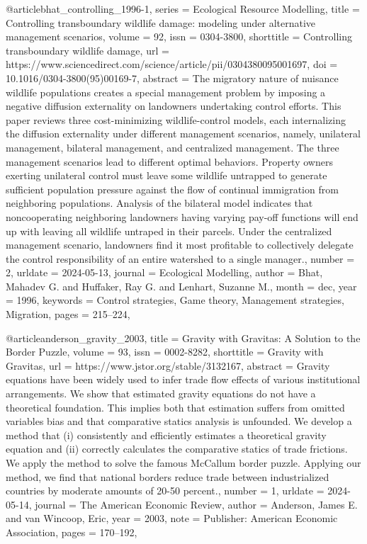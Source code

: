 {{{{@article{bhat_controlling_1996-1,
	series = {Ecological {Resource} {Modelling}},
	title = {Controlling transboundary wildlife damage: modeling under alternative management scenarios},
	volume = {92},
	issn = {0304-3800},
	shorttitle = {Controlling transboundary wildlife damage},
	url = {https://www.sciencedirect.com/science/article/pii/0304380095001697},
	doi = {10.1016/0304-3800(95)00169-7},
	abstract = {The migratory nature of nuisance wildlife populations creates a special management problem by imposing a negative diffusion externality on landowners undertaking control efforts. This paper reviews three cost-minimizing wildlife-control models, each internalizing the diffusion externality under different management scenarios, namely, unilateral management, bilateral management, and centralized management. The three management scenarios lead to different optimal behaviors. Property owners exerting unilateral control must leave some wildlife untrapped to generate sufficient population pressure against the flow of continual immigration from neighboring populations. Analysis of the bilateral model indicates that noncooperating neighboring landowners having varying pay-off functions will end up with leaving all wildlife untraped in their parcels. Under the centralized management scenario, landowners find it most profitable to collectively delegate the control responsibility of an entire watershed to a single manager.},
	number = {2},
	urldate = {2024-05-13},
	journal = {Ecological Modelling},
	author = {Bhat, Mahadev G. and Huffaker, Ray G. and Lenhart, Suzanne M.},
	month = dec,
	year = {1996},
	keywords = {Control strategies, Game theory, Management strategies, Migration},
	pages = {215--224},
}

@article{anderson_gravity_2003,
	title = {Gravity with {Gravitas}: {A} {Solution} to the {Border} {Puzzle}},
	volume = {93},
	issn = {0002-8282},
	shorttitle = {Gravity with {Gravitas}},
	url = {https://www.jstor.org/stable/3132167},
	abstract = {Gravity equations have been widely used to infer trade flow effects of various institutional arrangements. We show that estimated gravity equations do not have a theoretical foundation. This implies both that estimation suffers from omitted variables bias and that comparative statics analysis is unfounded. We develop a method that (i) consistently and efficiently estimates a theoretical gravity equation and (ii) correctly calculates the comparative statics of trade frictions. We apply the method to solve the famous McCallum border puzzle. Applying our method, we find that national borders reduce trade between industrialized countries by moderate amounts of 20-50 percent.},
	number = {1},
	urldate = {2024-05-14},
	journal = {The American Economic Review},
	author = {Anderson, James E. and van Wincoop, Eric},
	year = {2003},
	note = {Publisher: American Economic Association},
	pages = {170--192},
}

}}}}
